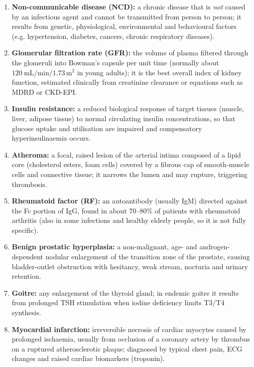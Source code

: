 \documentclass[11pt]{article}
\begin{document}
\begin{corrige}
\begin{enumerate}
\item \textbf{Non-communicable disease (NCD):} a chronic disease that is \emph{not} caused by an infectious agent and cannot be transmitted from person to person; it results from genetic, physiological, environmental and behavioural factors (e.g. hypertension, diabetes, cancers, chronic respiratory diseases).
\item \textbf{Glomerular filtration rate (GFR):} the volume of plasma filtered through the glomeruli into Bowman's capsule per unit time (normally about $120\ \mathrm{mL/min/1.73\,m^2}$ in young adults); it is the best overall index of kidney function, estimated clinically from creatinine clearance or equations such as MDRD or CKD-EPI.
\item \textbf{Insulin resistance:} a reduced biological response of target tissues (muscle, liver, adipose tissue) to normal circulating insulin concentrations, so that glucose uptake and utilisation are impaired and compensatory hyperinsulinaemia occurs.
\item \textbf{Atheroma:} a focal, raised lesion of the arterial intima composed of a lipid core (cholesterol esters, foam cells) covered by a fibrous cap of smooth-muscle cells and connective tissue; it narrows the lumen and may rupture, triggering thrombosis.
\item \textbf{Rheumatoid factor (RF):} an autoantibody (usually IgM) directed against the Fc portion of IgG, found in about 70--80\% of patients with rheumatoid arthritis (also in some infections and healthy elderly people, so it is not fully specific).
\item \textbf{Benign prostatic hyperplasia:} a non-malignant, age- and androgen-dependent nodular enlargement of the transition zone of the prostate, causing bladder-outlet obstruction with hesitancy, weak stream, nocturia and urinary retention.
\item \textbf{Goitre:} any enlargement of the thyroid gland; in endemic goitre it results from prolonged TSH stimulation when iodine deficiency limits T3/T4 synthesis.
\item \textbf{Myocardial infarction:} irreversible necrosis of cardiac myocytes caused by prolonged ischaemia, usually from occlusion of a coronary artery by thrombus on a ruptured atherosclerotic plaque; diagnosed by typical chest pain, ECG changes and raised cardiac biomarkers (troponin).
\end{enumerate}
\end{corrige}
\end{document}
